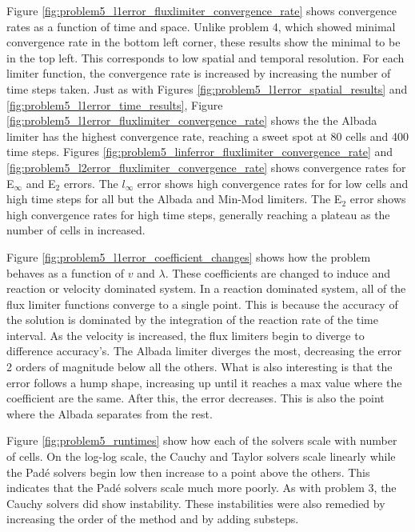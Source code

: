 Figure \ref{fig:problem5_l1error_fluxlimiter_convergence_rate} shows convergence rates as a function of time and space. Unlike problem 4, which showed minimal convergence rate in the bottom left corner, these results show the minimal to be in the top left. This corresponds to low spatial and temporal resolution. For each limiter function, the convergence rate is increased by increasing the number of time steps taken. Just as with Figures \ref{fig:problem5_l1error_spatial_results} and \ref{fig:problem5_l1error_time_results}, Figure \ref{fig:problem5_l1error_fluxlimiter_convergence_rate} shows the the Albada limiter has the highest convergence rate, reaching a sweet spot at 80 cells and 400 time steps. Figures \ref{fig:problem5_linferror_fluxlimiter_convergence_rate} and \ref{fig:problem5_l2error_fluxlimiter_convergence_rate} shows convergence rates for E${}_{\infty}$ and E${}_{2}$ errors. The $l_{\infty}$ error shows high convergence rates for for low cells and high time steps for all but the Albada and Min-Mod limiters. The E${}_{2}$ error shows high convergence rates for high time steps, generally reaching a plateau as the number of cells in increased.

Figure \ref{fig:problem5_l1error_coefficient_changes} shows how the problem behaves as a function of $v$ and $\lambda$. These coefficients are changed to induce and reaction or velocity dominated system. In a reaction dominated system, all of the flux limiter functions converge to a single point. This is because the accuracy of the solution is dominated by the integration of the reaction rate of the time interval. As the velocity is increased, the flux limiters begin to diverge to difference accuracy's. The Albada limiter diverges the most, decreasing the error 2 orders of magnitude below all the others. What is also interesting is that the error follows a hump shape, increasing up until it reaches a max value where the coefficient are the same. After this, the error decreases. This is also the point where the Albada separates from the rest. 

Figure \ref{fig:problem5_runtimes} show how each of the solvers scale with number of cells. On the log-log scale, the Cauchy and Taylor solvers scale linearly while the Pad\'e solvers begin low then increase to a point above the others. This indicates that the Pad\'e solvers scale much more poorly. As with problem 3, the Cauchy solvers did show instability. These instabilities were also remedied by increasing the order of the method and by adding substeps. 

